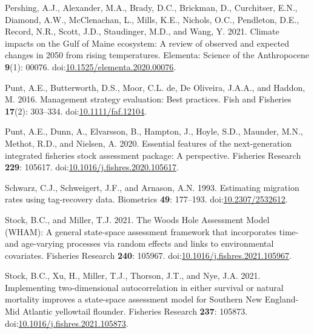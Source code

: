 \documentclass[
]{article}
\newlength{\cslhangindent}
\newlength{\cslentryspacingunit} %
\newenvironment{CSLReferences}[2] %
 {%
  \setlength{\parindent}{0pt}
  \ifodd #1
  \let\oldpar\par
  \def\par{\hangindent=\cslhangindent\oldpar}
  \fi
  \setlength{\parskip}{#2\cslentryspacingunit}
 }%
 {}
\begin{document}
\begin{CSLReferences}{1}{0}
\leavevmode{}%
Pershing, A.J., Alexander, M.A., Brady, D.C., Brickman, D., Curchitser, E.N., Diamond, A.W., McClenachan, L., Mills, K.E., Nichols, O.C., Pendleton, D.E., Record, N.R., Scott, J.D., Staudinger, M.D., and Wang, Y. 2021. Climate impacts on the {G}ulf of {M}aine ecosystem: A review of observed and expected changes in 2050 from rising temperatures. Elementa: Science of the Anthropocene \textbf{9}(1): 00076. doi:\href{https://doi.org/10.1525/elementa.2020.00076}{10.1525/elementa.2020.00076}.

\leavevmode{}%
Punt, A.E., Butterworth, D.S., Moor, C.L. de, De Oliveira, J.A.A., and Haddon, M. 2016. Management strategy evaluation: Best practices. Fish and Fisheries \textbf{17}(2): 303--334. doi:\href{https://doi.org/10.1111/faf.12104}{10.1111/faf.12104}.

\leavevmode{}%
Punt, A.E., Dunn, A., Elvarsson, B., Hampton, J., Hoyle, S.D., Maunder, M.N., Methot, R.D., and Nielsen, A. 2020. Essential features of the next-generation integrated fisheries stock assessment package: A perspective. Fisheries Research \textbf{229}: 105617. doi:\href{https://doi.org/10.1016/j.fishres.2020.105617}{10.1016/j.fishres.2020.105617}.

\leavevmode{}%
Schwarz, C.J., Schweigert, J.F., and Arnason, A.N. 1993. Estimating migration rates using tag-recovery data. Biometrics \textbf{49}: 177--193. doi:\href{https://doi.org/10.2307/2532612}{10.2307/2532612}.

\leavevmode{}%
Stock, B.C., and Miller, T.J. 2021. The {Woods Hole Assessment Model} ({WHAM}): A general state-space assessment framework that incorporates time- and age-varying processes via random effects and links to environmental covariates. Fisheries Research \textbf{240}: 105967. doi:\href{https://doi.org/10.1016/j.fishres.2021.105967}{10.1016/j.fishres.2021.105967}.

\leavevmode{}%
Stock, B.C., Xu, H., Miller, T.J., Thorson, J.T., and Nye, J.A. 2021. Implementing two-dimensional autocorrelation in either survival or natural mortality improves a state-space assessment model for {Southern New England}-{Mid Atlantic} yellowtail flounder. Fisheries Research \textbf{237}: 105873. doi:\href{https://doi.org/10.1016/j.fishres.2021.105873}{10.1016/j.fishres.2021.105873}.


\end{CSLReferences}
\end{document}
